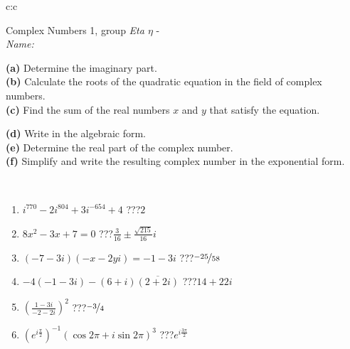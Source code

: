 \documentclass[10pt]{report}
\begin{document}
\begin{tabular}{c:c}
\begin{minipage}[c][104.5mm][t]{0.5\linewidth}
\begin{center}
\vspace{5mm}
{\huge Complex Numbers 1, group \textit{Eta $\eta$} -}\\[5mm]
\textit{Name:}\phantom{xxxxxxxxxxxxxxxxxxxxxxxxxxxxxxxxxxxxxxxxxxxxxxxxxxxxxxxxxxxxxxxxx}\\[5mm]
\begin{minipage}{0.95\linewidth}
\begin{center}
{\small \begin{minipage}{0.44\textwidth} \raggedright
\textbf{(a)} Determine the imaginary part. \\[1mm]
\textbf{(b)} Calculate the roots of the quadratic equation in the field of complex numbers. \\[1mm]
\textbf{(c)} Find the sum of the real numbers \(x\) and \(y\) that satisfy the equation. \end{minipage} \begin{minipage}{0.54\textwidth}
\textbf{(d)} Write in the algebraic form. \\[1mm]
\textbf{(e)} Determine the real part of the complex number. \\[1mm]
\textbf{(f)} Simplify and write the resulting complex number in the exponential form.
\end{minipage}
} \vspace{3mm}
\end{center}
\end{minipage}
\\[1mm]
\begin{minipage}{0.79\linewidth}
\begin{center}
\begin{varwidth}{\linewidth}
\setlength{\itemsep}{0pt}
\begin{enumerate}
\large
\item $i^{770}-2i^{804}+3i^{-654}+4$\quad \dotfill\; ???\;\dotfill \quad $2$
\item $8x^2-3x+7=0$\quad \dotfill\; ???\;\dotfill \quad $\frac{3}{16} \pm{}\frac{ \sqrt{215}}{16}i$
\item $(-7-3i)(-x-2yi)=-1-3i$\quad \dotfill\; ???\;\dotfill \quad $\nicefrac{-25}{58}$
\item $-4(-1-3i)-(6+i)\overline{(2+2i)}$\quad \dotfill\; ???\;\dotfill \quad $14+22i$
\item $\left(\frac{1-3i}{-2-2i}\right)^2$\quad \dotfill\; ???\;\dotfill \quad $\nicefrac{-3}{4}$
\item $\left(e^{i\frac{\pi}{2}}\right)^{-1}\left(\cos{2\pi}+i\sin{2\pi}\right)^{3}$\quad \dotfill\; ???\;\dotfill \quad $e^{i\frac{3\pi}{2}}$

\end{enumerate}
\end{varwidth}
\end{center}
\end{minipage}
\end{center}
\end{minipage}
\end{tabular}
\end{document}
